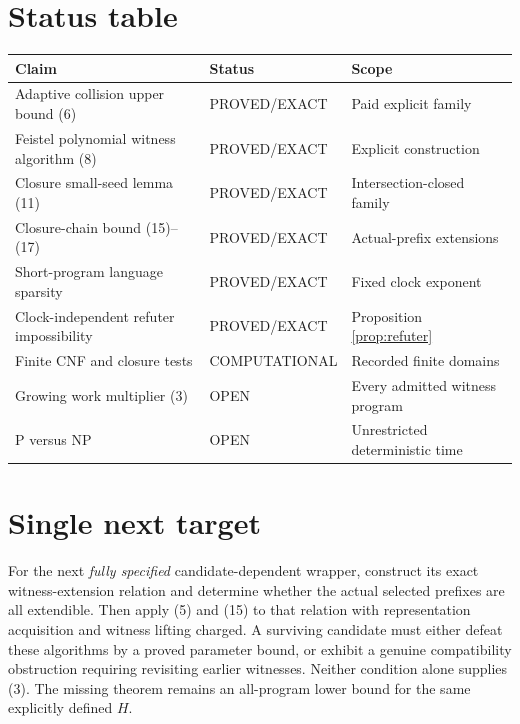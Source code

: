 \documentclass[11pt]{article}
\begin{document}
\section*{Status table}
\begin{longtable}{p{}p{}p{}}
\toprule
Claim & Status & Scope\\
\midrule
Adaptive collision upper bound (6) & PROVED/EXACT & Paid explicit family\\
Feistel polynomial witness algorithm (8) & PROVED/EXACT & Explicit construction\\
Closure small-seed lemma (11) & PROVED/EXACT & Intersection-closed family\\
Closure-chain bound (15)--(17) & PROVED/EXACT & Actual-prefix extensions\\
Short-program language sparsity & PROVED/EXACT & Fixed clock exponent\\
Clock-independent refuter impossibility & PROVED/EXACT & Proposition \ref{prop:refuter}\\
Finite CNF and closure tests & COMPUTATIONAL & Recorded finite domains\\
Growing work multiplier (3) & OPEN & Every admitted witness program\\
P versus NP & OPEN & Unrestricted deterministic time\\
\bottomrule
\end{longtable}

\section*{Single next target}
For the next \emph{fully specified} candidate-dependent wrapper,
construct its exact witness-extension relation and determine whether
the actual selected prefixes are all extendible.
Then apply (5) and (15) to that relation with representation acquisition
and witness lifting charged. A surviving candidate must either defeat
these algorithms by a proved parameter bound, or exhibit a genuine
compatibility obstruction requiring revisiting earlier witnesses.
Neither condition alone supplies (3). The missing theorem remains an
all-program lower bound for the same explicitly defined $H$.



\end{document}
